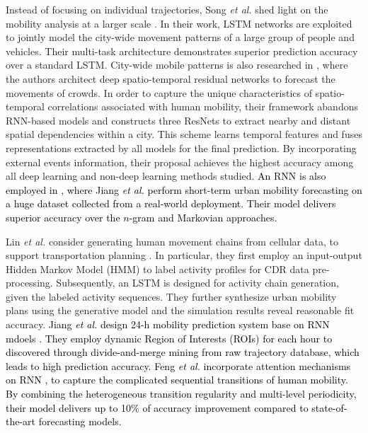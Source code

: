 \documentclass[journal,comsoc,letter]{IEEEtran}
\newcommand{\edit}[1]{\textcolor{black}{#1}}
\newcommand{\rev}[1]{\textcolor{black}{#1}}
\begin{document}
Instead of focusing on individual trajectories, Song \emph{et al.} shed light on the mobility analysis at a larger scale \cite{song2016deeptransport}. In their work, LSTM networks are exploited to jointly model the city-wide movement patterns of a large group of people and vehicles. Their multi-task architecture demonstrates superior prediction accuracy over a standard LSTM. City-wide mobile patterns is also researched in \cite{zhang2017deep123}, where the authors architect deep spatio-temporal residual networks to forecast the movements of crowds. In order to capture the unique characteristics of spatio-temporal correlations associated with human mobility, their framework abandons RNN-based models and constructs three ResNets to extract nearby and distant spatial dependencies within a city. This scheme learns temporal features and fuses representations extracted by all models for the final prediction. By incorporating external events information, their proposal achieves the highest accuracy among all deep learning and non-deep learning methods studied. \rev{An RNN is also employed in \cite{jiang2018deepurbanmomentum}, where Jiang \emph{et al.} perform short-term urban mobility forecasting on a huge dataset collected from a real-world deployment. Their model delivers superior accuracy over the $n$-gram and Markovian approaches.}

Lin \emph{et al.} consider generating human movement chains from cellular data, to support transportation planning \cite{lin2017deep}. In particular, they first employ an input-output Hidden Markov Model (HMM) to label activity profiles for CDR data pre-processing. Subsequently, an LSTM is designed for activity chain generation, given the labeled activity sequences. They further synthesize urban mobility plans using the generative model and the simulation results reveal reasonable fit accuracy. \edit{Jiang \emph{et al.} design 24-h mobility prediction system base on RNN mdoels \cite{jiang2018deep}. They employ dynamic Region of Interests (ROIs) for each hour to discovered through divide-and-merge mining from raw trajectory database, which leads to high prediction accuracy. Feng \emph{et al.} incorporate attention mechanisms on RNN \cite{feng2018deepmove}, to capture the complicated sequential transitions of human mobility. By combining the heterogeneous transition regularity and multi-level periodicity, their model delivers up to 10\% of accuracy improvement compared to state-of-the-art forecasting models.}
\end{document}
